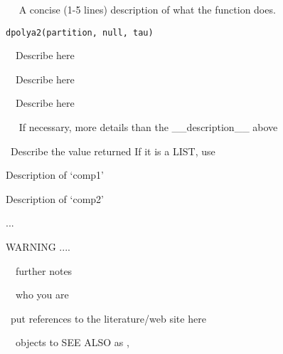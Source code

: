 \begin{Description}\relax
~~ A concise (1-5 lines) description of what the function does. ~~\end{Description}
\begin{Usage}
\begin{verbatim}
dpolya2(partition, null, tau)
\end{verbatim}
\end{Usage}
\begin{Arguments}
\begin{ldescription}
\item[\code{partition}] ~~Describe  here~~ 
\item[\code{null}] ~~Describe  here~~ 
\item[\code{tau}] ~~Describe  here~~ 
\end{ldescription}
\end{Arguments}
\begin{Details}\relax
~~ If necessary, more details than the __description__  above ~~\end{Details}
\begin{Value}
~Describe the value returned
If it is a LIST, use
\begin{ldescription}
\item[\code{comp1 }] Description of `comp1'
\item[\code{comp2 }] Description of `comp2'
\end{ldescription}

...\end{Value}
\begin{Section}{WARNING}
....\end{Section}
\begin{Note}\relax
~~further notes~~\end{Note}
\begin{Author}\relax
~~who you are~~\end{Author}
\begin{References}\relax
~put references to the literature/web site here ~\end{References}
\begin{SeeAlso}\relax
~~objects to SEE ALSO as , ~~~\end{SeeAlso}
